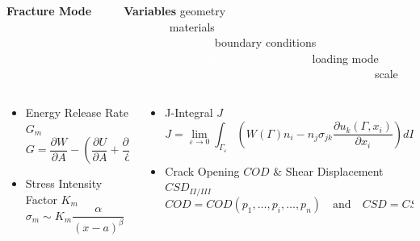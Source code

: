 \documentclass[first,firstsupp,lastsupp,last,hyperref,table]{ETHclass}
\begin{document}
\begin{frame}
\begin{columns}
\begin{column}{0.5\textwidth}
\begin{alertblock}{\tiny\centering\textbf{Fracture Mode}}
\begin{columns}
\begin{column}{0.3\columnwidth}
\end{column}
\end{columns}
\end{alertblock}
\end{column}
\begin{column}{0.5\textwidth}
\begin{alertblock}{\tiny\centering\textbf{Variables}}
\tiny\flushleft
geometry\\
\textcolor{white}{geometry}materials\\
\textcolor{white}{geometrymaterials}boundary conditions\\
\textcolor{white}{geometrymaterialsboundaryconditions}loading mode\\
\textcolor{white}{geometrymaterialsboundaryconditionsloadingmode}scale
\end{alertblock}
\end{column}
\end{columns}

\begin{columns}
\begin{column}{0.5\textwidth}
\begin{itemize}[label=]
\item Energy Release Rate $G_{m}$
\begin{equation*}
G=\frac{\partial W}{\partial A} - \left(\frac{\partial U}{\partial A}+\frac{\partial E_{k}}{\partial A}\right)
\end{equation*}
\item Stress Intensity Factor $K_{m}$
\begin{equation*}
\sigma_{m}\sim K_{m}\frac{\alpha}{\left(x-a\right)^{\beta}}\quad\alpha,\beta>0
\end{equation*}
\end{itemize}
\end{column}
\begin{column}{0.5\textwidth}
\begin{itemize}[label=]
\item J-Integral $J$
\begin{equation*}
J=\lim_{\varepsilon\to 0}\int_{\Gamma_{\varepsilon}}\left(W\left(\Gamma\right)n_{i}-n_{j}\sigma_{jk}\frac{\partial u_{k}\left(\Gamma,x_{i}\right)}{\partial x_{i}}\right)d\Gamma
\end{equation*}
\item Crack Opening $COD$ \& Shear Displacement $CSD_{II/III}$
\begin{equation*}
COD=COD\left(p_{1},\dots,p_{i},\dots,p_{n}\right)\quad\text{and}\quad CSD=CSD\left(p_{1},\dots,p_{i},\dots,p_{n}\right)
\end{equation*}
\end{itemize}
\end{column}
\end{columns}
\end{frame}
\end{document}
